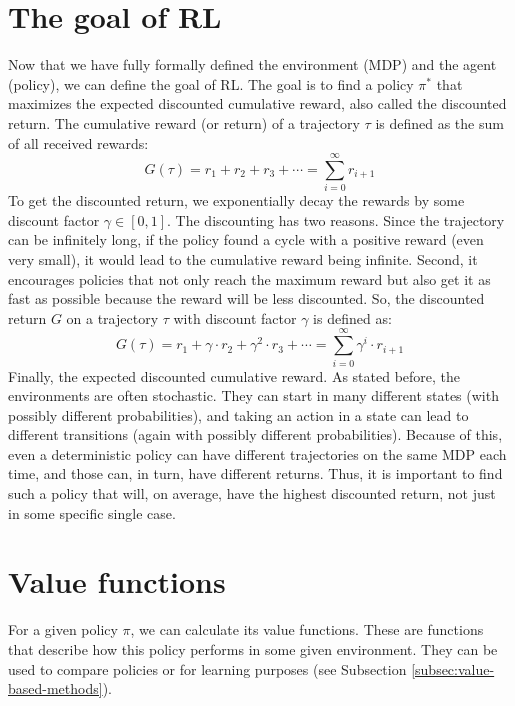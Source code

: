 \documentclass[
  digital,     %
  oneside,     %
  nosansbold,  %
  nocolorbold, %
  lof,         %
  lot,         %
]{fithesis4}
\begin{document}
\section{The goal of RL}
\label{sec:goal}
Now that we have fully formally defined the environment (MDP) and the agent (policy), we can define the goal of RL. The goal is to find a policy $\pi^*$ that maximizes the expected discounted cumulative reward, also called the discounted return. The cumulative reward (or return) of a trajectory $\tau$ is defined as the sum of all received rewards:
\begin{equation}
G(\tau) = r_1+r_2+r_3+\dotsb = \sum_{i=0}^{\infty} r_{i+1}
\end{equation}
To get the discounted return, we exponentially decay the rewards by some discount factor $\gamma \in [0,1]$. The discounting has two reasons. Since the trajectory can be infinitely long, if the policy found a cycle with a positive reward (even very small), it would lead to the cumulative reward being infinite. Second, it encourages policies that not only reach the maximum reward but also get it as fast as possible because the reward will be less discounted. So, the discounted return $G$ on a trajectory $\tau$ with discount factor $\gamma$ is defined as:
\begin{equation}
G(\tau)=r_1+\gamma \cdot r_2+ \gamma^2 \cdot r_3+\dotsb = \sum_{i=0}^{\infty} \gamma^i\cdot r_{i+1}
\end{equation}
Finally, the expected discounted cumulative reward. As stated before, the environments are often stochastic. They can start in many different states (with possibly different probabilities), and taking an action in a state can lead to different transitions (again with possibly different probabilities). Because of this, even a deterministic policy can have different trajectories on the same MDP each time, and those can, in turn, have different returns. Thus, it is important to find such a policy that will, on average, have the highest discounted return, not just in some specific single case.

\section{Value functions}

For a given policy $\pi$, we can calculate its value functions. These are functions that describe how this policy performs in some given environment. They can be used to compare policies or for learning purposes (see Subsection \ref{subsec:value-based-methods}).
\end{document}
